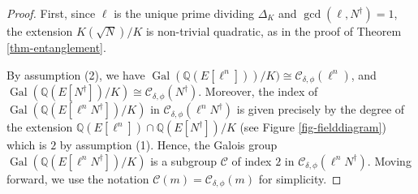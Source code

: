 \documentclass[11pt]{amsart}
\theoremstyle{definition}
\newcommand{\Q}{\mathbb{Q}}
\newcommand{\cC}{\mathcal{C}}
\newcommand{\Gal}{\operatorname{Gal}}
\begin{document}
\begin{proof}

First, since $\ell$ is the unique prime dividing $\Delta_K$ and $\gcd(\ell,N^\dagger)=1$, the extension $K(\sqrt{N})/K$ is non-trivial quadratic, as in the proof of Theorem \ref{thm-entanglement}.

By assumption (2), we have $\Gal(\Q(E[\ell^n]))/K)\cong \cC_{\delta,\phi}(\ell^n)$, and  $\Gal(\Q(E[N^\dagger])/K) \cong \cC_{\delta,\phi}(N^\dagger)$. Moreover, the index of $\Gal(\Q(E[\ell^n N^\dagger])/K)$ in $\cC_{\delta,\phi}(\ell^n N^\dagger)$ is given precisely by the degree of the extension $\Q(E[\ell^n])\cap \Q(E[N^\dagger])/K$ (see Figure \ref{fig-fielddiagram}) which is $2$ by assumption (1). Hence, the Galois group $\Gal(\Q(E[\ell^n N^\dagger])/K)$ is a subgroup $\cC$ of index $2$ in $\cC_{\delta,\phi}(\ell^n N^\dagger)$. Moving forward, we use the notation $\cC(m) = \cC_{\delta, \phi}(m)$ for simplicity.


\end{proof}
\end{document}

